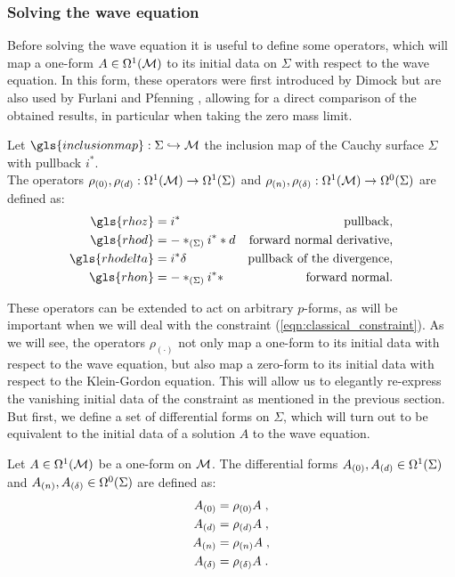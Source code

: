\subsubsection{Solving the wave equation}
Before solving the wave equation it is useful to define some operators, which will map a one-form $A \in \Omega^1(\mathcal{M})$ to its initial data on $\Sigma$ with respect to the wave equation. In this form, these operators were first introduced by Dimock \cite{dimock1992quantizedEM} but are also used by Furlani \cite{FURLANI} and Pfenning \cite{pfenning}, allowing for a direct comparison of the obtained results, in particular when taking the zero mass limit.
%
\begin{definition}\label{def:cauchy_mapping_operators}
 Let $\gls{inclusionmap} : \Sigma \hookrightarrow \M$ the inclusion map of the Cauchy surface $\Sigma$ with pullback $i^*$.\\
 The operators $\rho_{(0)}, \rho_{(d)} : \Omega^1(\mathcal{M}) \to \Omega^1(\Sigma)$ and $\rho_{(n)}, \rho_{(\delta)} : \Omega^1(\mathcal{M}) \to \Omega^0(\Sigma)$ are defined as:
 \begin{subequations}
  \begin{align}
  \gls{rhoz} 		&= i^* 										&\textrm{pullback,} \\
  \gls{rhod} 		&= -*_{(\Sigma)} i^* * d 		&\textrm{forward normal derivative,} \\
  \gls{rhodelta} 	&= i^*\delta 						&\textrm{pullback of the divergence,} \\
  \gls{rhon} 		&= -*_{(\Sigma)} i^* *  		&\textrm{forward normal.}
 \end{align}
 \end{subequations}
%
%
\end{definition}
These operators can be extended to act on arbitrary $p$-forms, as will be important when we will deal with the constraint (\ref{eqn:classical_constraint}). As we will see, the operators $\rho_{(\cdot)}$ not only map a one-form to its initial data with respect to the wave equation, but also map a zero-form to its initial data with respect to the Klein-Gordon equation. This will allow us to elegantly re-express the vanishing initial data of the constraint as mentioned in the previous section.
But first, we define a set of differential forms on $\Sigma$, which will turn out to be equivalent to the initial data of a solution $A$ to the wave equation.
%
\begin{definition}\label{def:cauchy_data_wave_eq}
 Let $A \in \Omega^1(\mathcal{M})$ be a one-form on $\mathcal{M}$. The differential forms ${A_{(0)}}, {A_{(d)}} \in \Omega^1(\Sigma)$ and ${A_{(n)}}, {A_{(\delta)}} \in \Omega^0(\Sigma)$ are defined as:
 \begin{subequations}
  \begin{align}
  {A_{(0)}} &= \rho_{(0)} A \;,\\
  {A_{(d)}} &= \rho_{(d)} A \;, \\
  {A_{(n)}} &= \rho_{(n)} A \;, \\
  {A_{(\delta)}} &= \rho_{(\delta)} A \;.
  \end{align}
 \end{subequations}
%
%
\end{definition}
